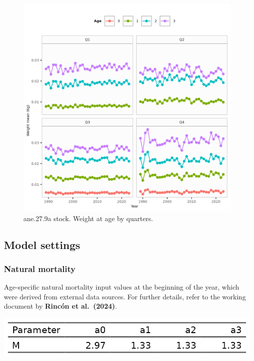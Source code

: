 \documentclass[
]{article}
\begin{document}
\begin{figure}[H]

{\centering \includegraphics[width=0.95\linewidth]{report/run/S1.0_4FLEETS/fig_weight_by_quarters} 

}

\caption{ane.27.9a stock. Weight at age by quarters.}\label{fig:unnamed-chunk-9}
\end{figure}

\hypertarget{model-settings}{%
\subsection{Model settings}\label{model-settings}}

\hypertarget{natural-mortality}{%
\subsubsection{Natural mortality}\label{natural-mortality}}

Age-specific natural mortality input values at the beginning of the
year, which were derived from external data sources. For further
details, refer to the working document by \textbf{Rincón et al.~(2024)}.

\begin{center}\includegraphics[width=0.95\linewidth]{report/run/S1.0_4FLEETS/tb_natM} \end{center}
\end{document}
